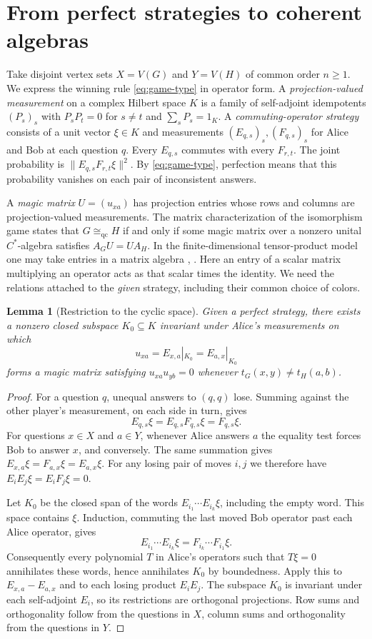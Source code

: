 \documentclass[11pt,reqno]{amsart}
\numberwithin{equation}{section}
\newtheorem{lemma}[theorem]{Lemma}
\theoremstyle{definition}
\newcommand{\qc}{\mathrm{qc}}
\begin{document}
\section{From perfect strategies to coherent algebras}\label{sec:transport}
Take disjoint vertex sets $X=V(G)$ and $Y=V(H)$ of common order $n\ge1$. We express the winning rule \eqref{eq:game-type} in operator form.
A \emph{projection-valued measurement} on a complex Hilbert space $K$ is a
family of self-adjoint idempotents $(P_s)_s$ with $P_sP_t=0$ for $s\ne t$
and $\sum_sP_s=1_K$. A \emph{commuting-operator strategy} consists of a unit
vector $\xi\in K$ and measurements $(E_{q,s})_s,(F_{q,s})_s$ for Alice and
Bob at each question $q$. Every $E_{q,s}$ commutes with every $F_{r,t}$.
The joint probability is $\|E_{q,s}F_{r,t}\xi\|^2$. By \eqref{eq:game-type}, perfection means that this probability vanishes on each pair of inconsistent answers.

A \emph{magic matrix} $U=(u_{xa})$ has projection entries whose rows and
columns are projection-valued measurements. The matrix characterization of
the isomorphism game states that $G\cong_{\qc}H$ if and only if some magic matrix over
a nonzero unital $C^*$-algebra satisfies $A_GU=UA_H$. In the
finite-dimensional tensor-product model one may take entries in a matrix
algebra \cite[Thms.~2.4 and 4.4]{LMR}, \cite[Thm.~5.8]{AMRSSV}.
Here an entry of a scalar matrix multiplying an operator acts as that scalar
times the identity. We need the relations attached to the \emph{given}
strategy, including their common choice of colors.

\begin{lemma}[Restriction to the cyclic space]\label{lem:cyclic-restriction}
Given a perfect strategy, there exists a nonzero closed subspace
$K_0\subseteq K$ invariant under Alice's measurements on which
\[
 u_{xa}=E_{x,a}|_{K_0}=E_{a,x}|_{K_0}
\]
forms a magic matrix satisfying
$u_{xa}u_{yb}=0$ whenever $t_G(x,y)\ne t_H(a,b)$.
\end{lemma}
\begin{proof}
For a question $q$, unequal answers to $(q,q)$ lose. Summing against the other
player's measurement, on each side in turn, gives
\[
 E_{q,s}\xi=E_{q,s}F_{q,s}\xi=F_{q,s}\xi .
\]
For questions $x\in X$ and $a\in Y$, whenever Alice answers $a$ the
equality test forces Bob to answer $x$, and conversely. The same summation
gives $E_{x,a}\xi=F_{a,x}\xi=E_{a,x}\xi$.
For any losing pair of moves $i,j$ we therefore have
$E_iE_j\xi=E_iF_j\xi=0$.

Let $K_0$ be the closed span of the words $E_{i_1}\cdots E_{i_k}\xi$,
including the empty word. This space contains $\xi$. Induction, commuting the
last moved Bob operator past each Alice operator, gives
\[
 E_{i_1}\cdots E_{i_k}\xi=F_{i_k}\cdots F_{i_1}\xi .
\]
Consequently every polynomial $T$ in Alice's operators such that $T\xi=0$
annihilates these words, hence annihilates $K_0$ by boundedness. Apply this
to $E_{x,a}-E_{a,x}$ and to each losing product $E_iE_j$. The subspace
$K_0$ is invariant under each self-adjoint $E_i$, so its restrictions are
orthogonal projections. Row sums and orthogonality follow from the questions
in $X$, column sums and orthogonality from the questions in $Y$.
\end{proof}
\end{document}
